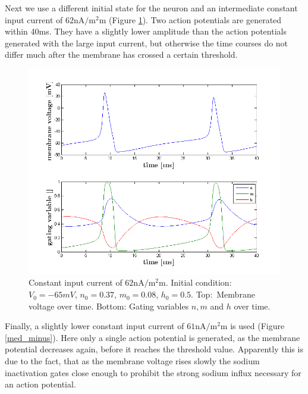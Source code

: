 \documentclass{scrartcl}
\begin{document}
Next we use a different initial state for the neuron and an intermediate constant input current of $62 \si{\nano\ampere\per\square\milli\meter}$ (Figure \ref{med}). Two action potentials are generated within 40\si{ms}. They have a slightly lower amplitude than the action potentials generated with the large input current, but otherwise the time courses do not differ much after the membrane has crossed a certain threshold.

\begin{figure}
\centering
\includegraphics[trim = {1.4cm 0.3 1.8cm 1cm}, height=0.35\textheight, clip]{../pics/med}
\caption{Constant input current of $62 \si{\nano\ampere\per\square\milli\meter}$. Initial condition: $V_0=-65\si{mV}$, $n_0=0.37$, $m_0=0.08$, $h_0 = 0.5$. Top:~Membrane voltage over time. Bottom: Gating variables $n, m$ and $h$ over time.}
\label{med}
\end{figure}

Finally, a slightly lower constant input current of $61 \si{\nano\ampere\per\square\milli\meter}$ is used (Figure \ref{med_minus}). Here only a single action potential is generated, as the membrane potential decreases again, before it reaches the threshold value. Apparently this is due to the fact, that as the membrane voltage rises slowly the sodium inactivation gates close enough to prohibit the strong sodium influx necessary for an action potential.
\end{document}
